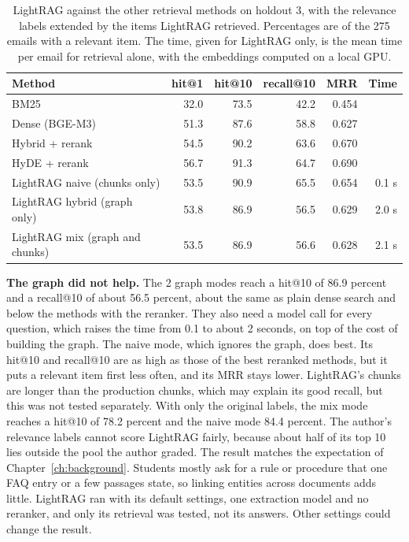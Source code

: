 \begin{table}[htbp]
\centering
\caption[LightRAG against the other retrieval methods on holdout 3]{LightRAG against the other retrieval methods on holdout 3, with the relevance labels extended by the items LightRAG retrieved. Percentages are of the 275 emails with a relevant item. The time, given for LightRAG only, is the mean time per email for retrieval alone, with the embeddings computed on a local GPU.}
\label{tab:lightrag}
\small
\begin{tabular}{@{}lrrrrr@{}}
\toprule
Method & hit@1 & hit@10 & recall@10 & MRR & Time \\
\midrule
BM25 & 32.0 & 73.5 & 42.2 & 0.454 & \\
Dense (BGE-M3) & 51.3 & 87.6 & 58.8 & 0.627 & \\
Hybrid + rerank & 54.5 & 90.2 & 63.6 & 0.670 & \\
HyDE + rerank & 56.7 & 91.3 & 64.7 & 0.690 & \\
\midrule
LightRAG naive (chunks only) & 53.5 & 90.9 & 65.5 & 0.654 & 0.1 s \\
LightRAG hybrid (graph only) & 53.8 & 86.9 & 56.5 & 0.629 & 2.0 s \\
LightRAG mix (graph and chunks) & 53.5 & 86.9 & 56.6 & 0.628 & 2.1 s \\
\bottomrule
\end{tabular}
\end{table}

\textbf{The graph did not help.} The 2 graph modes reach a hit@10 of 86.9 percent and a recall@10 of about 56.5 percent, about the same as plain dense search and below the methods with the reranker. They also need a model call for every question, which raises the time from 0.1 to about 2 seconds, on top of the cost of building the graph. The naive mode, which ignores the graph, does best. Its hit@10 and recall@10 are as high as those of the best reranked methods, but it puts a relevant item first less often, and its MRR stays lower. LightRAG's chunks are longer than the production chunks, which may explain its good recall, but this was not tested separately. With only the original labels, the mix mode reaches a hit@10 of 78.2 percent and the naive mode 84.4 percent. The author's relevance labels cannot score LightRAG fairly, because about half of its top 10 lies outside the pool the author graded. The result matches the expectation of Chapter~\ref{ch:background}. Students mostly ask for a rule or procedure that one FAQ entry or a few passages state, so linking entities across documents adds little. LightRAG ran with its default settings, one extraction model and no reranker, and only its retrieval was tested, not its answers. Other settings could change the result.

